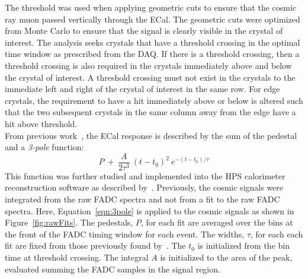 \documentclass[twoside]{article}
\begin{document}
\indent The threshold was used when applying geometric cuts to ensure that the cosmic ray muon passed vertically through the ECal. The geometric cuts were optimized from Monte Carlo to ensure that the signal is clearly visible in the crystal of interest. The analysis seeks crystals that have a threshold crossing in the optimal time window as prescribed from the DAQ. If there is a threshold crossing, then a threshold crossing is also required in the crystals immediately above and below the crystal of interest. A threshold crossing must not exist in the crystals to the immediate left and right of the crystal of interest in the same row. For edge crystals, the requirement to have a hit immediately above or below is altered such that the two subsequent crystals in the same column away from the edge have a hit above threshold.\\ 
\indent From previous work~\cite{charles_2014}, the ECal response is described by the sum of the pedestal and a {\em 3-pole} function:
\begin{equation}
  P\ +\ \frac{A}{2\tau^3}\ (t-t_0)^2\ e^{-(t-t_0)/\tau}
  \label{eqn:3pole}
\end{equation}
This function was further studied and implemented into the HPS calorimeter reconstruction software as described by~\cite{baltzell_ecal_2015}. Previously, the cosmic signals were integrated from the raw FADC spectra and not from a fit to the raw FADC spectra. Here, Equation~\eqref{eqn:3pole} is applied to the cosmic signals as shown in Figure~\ref{fig:rawFits}. The pedestals, $P$, for each fit are averaged over the bins at the front of the FADC timing window for each event. The widths, $\tau$, for each each fit are fixed from those previously found by~\cite{baltzell_ecal_2015}. The $t_0$ is initialized from the bin time at threshold crossing. The integral $A$ is initialized to the area of the peak, evaluated summing the FADC samples in the signal region.\\ 
\end{document}
